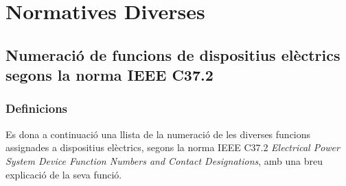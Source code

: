 \chapter{Normatives Diverses}\label{sec:ch-normes}

\section{Numeració de funcions de dispositius elèctrics segons la norma IEEE C37.2 }\label{sec:ieee-c37-2}

\subsection{Definicions}

Es dona a continuació una llista de la numeració de les diverses funcions assignades a dispositius
elèctrics, segons la norma IEEE C37.2 \textit{Electrical Power System Device Function Numbers and Contact Designations}, amb una breu
explicació de la seva funció.


